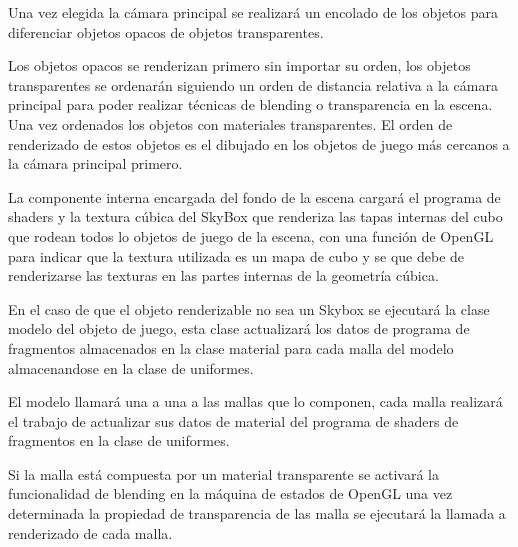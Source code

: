 \documentclass[a4paper, 17pt]{book}
\begin{document}
\vspace{1mm} %

Una vez elegida la cámara principal se realizará un encolado de los objetos para diferenciar objetos opacos de objetos transparentes. 

\vspace{1mm} %

Los objetos opacos se renderizan primero sin importar su orden, los objetos transparentes se ordenarán siguiendo un orden
de distancia relativa a la cámara principal para poder realizar técnicas de blending o transparencia en la escena. Una vez
ordenados los objetos con materiales transparentes. El orden de renderizado de estos objetos es el dibujado en los objetos
de juego más cercanos a la cámara principal primero.

\vspace{1mm} %

La componente interna encargada del fondo de la escena cargará el programa de shaders y la textura cúbica del SkyBox
que renderiza las tapas internas del cubo que rodean todos lo objetos de juego de la escena, con una función de OpenGL
para indicar que la textura utilizada es un mapa de cubo y se que debe de renderizarse las texturas en las partes
internas de la geometría cúbica.

\vspace{1mm} %

En el caso de que el objeto renderizable no sea un Skybox se ejecutará la clase modelo del objeto de juego, esta clase
actualizará los datos de programa de fragmentos almacenados en la clase material para cada malla del modelo almacenandose
en la clase de uniformes.

\vspace{1mm} %

El modelo llamará una a una a las mallas que lo componen, cada malla realizará el trabajo de actualizar sus datos de material
del programa de shaders de fragmentos en la clase de uniformes.

\vspace{1mm} %

Si la malla está compuesta por un material transparente se activará la funcionalidad de blending en la máquina de estados de
OpenGL una vez determinada la propiedad de transparencia de las malla se ejecutará la llamada a renderizado de cada malla. 

\vspace{1mm} %
\end{document}

